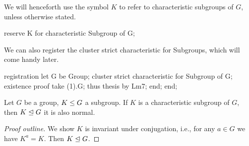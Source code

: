 \begin{reserve}
We will henceforth use the symbol $K$ to refer to characteristic
subgroups of $G$, unless otherwise stated.
\end{reserve}


\nwenddocs{}\plusendmoddef\nwstartdeflinemarkup{}\nwenddeflinemarkup
reserve K for characteristic Subgroup of G;
\nwendcode{}\nwdocspar

\begin{registration}
We can also register the cluster {\Tt{}strict\nwendquote} {\Tt{}characteristic\nwendquote} for
Subgroups, which will come handy later.
\end{registration}

\nwenddocs{}\endmoddef\nwstartdeflinemarkup{}\nwenddeflinemarkup
registration
  let G be Group;
  cluster strict characteristic for Subgroup of G;
  existence
  proof
    take (1).G;
    thus thesis by Lm7;
  end;
end;
\nwendcode{}\nwdocspar

\begin{theorem}
Let $G$ be a group, $K\leq G$ a subgroup. If $K$ is a
characteristic subgroup of $G$, then $K\trianglelefteq G$ it is also
normal.
\end{theorem}

\begin{proof}[Proof outline]
We show $K$ is invariant under conjugation, i.e., for any $a\in G$ we
have $K^{a}=K$. Then $K\trianglelefteq G$.
\end{proof}

